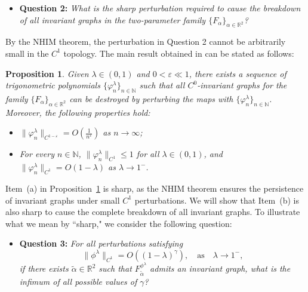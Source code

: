 \documentclass{amsart}
\newcommand{\R}{\mathbb{R}}
\newcommand{\al}{\alpha}
\newtheorem{Proposition}[Definition]{Proposition}
\theoremstyle{definition}
\begin{document}
\vspace{1ex}

\begin{itemize}
\item \textbf{Question 2:} {\it What is the sharp perturbation required to cause the breakdown of all invariant graphs in the two-parameter family $\{F_{\al}\}_{\alpha\in\mathbb{R}^2}$?}
\end{itemize}

\vspace{1ex}

By the NHIM theorem, the perturbation in Question 2 cannot be arbitrarily small in the $C^1$ topology.   The main result obtained in \cite{SoW} can be stated as follows:




\begin{Proposition}\label{Mt}
Given $\lambda \in (0,1)$ and $0 < \varepsilon \ll 1$, there exists a sequence of trigonometric polynomials $\{\varphi^{\lambda}_n\}_{n \in \mathbb{N}}$ such that all $C^0$-invariant graphs for the family $\{F_{\al}\}_{\alpha \in \mathbb{R}^2}$ can be destroyed by perturbing the maps with $\{\varphi^{\lambda}_n\}_{n \in \mathbb{N}}$. Moreover, the following properties hold:
\begin{itemize}
    \item[(a)] $\|\varphi^{\lambda}_n\|_{C^{1 - \varepsilon}} = O\left(\frac{1}{n^\varepsilon}\right)$ as $n \to \infty$;
    \item[(b)] For every $n \in \mathbb{N}$, $\|\varphi^{\lambda}_n\|_{C^1} \leq 1$ for all $\lambda \in (0,1)$, and $\|\varphi^{\lambda}_n\|_{C^1} = O(1 - \lambda)$ as $\lambda \to 1^-$.
\end{itemize}
\end{Proposition}

Item~(a) in Proposition~\ref{Mt} is sharp, as the NHIM theorem ensures the persistence of invariant graphs under small $C^1$ perturbations. We will show that Item~(b) is  also sharp  to cause the complete breakdown of all invariant graphs. To illustrate what we mean by ``sharp," we consider the following question:

\vspace{1ex}

\begin{itemize}
\item \textbf{Question 3:} {\it  For all perturbations satisfying
\[
\|\phi^{\lambda}\|_{C^1}=O((1-\lambda)^{\gamma}), \quad \text{as} \quad \lambda\to 1^-,
\]
if there exists $\tilde{\al}\in\R^2$ such that $F^{\phi^\lambda}_{\tilde{\al}}$ admits an invariant graph, what is the infimum of all possible values of $\gamma$?}
\end{itemize}
\end{document}
